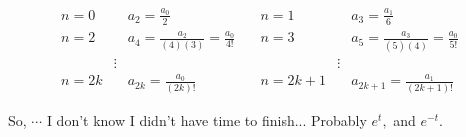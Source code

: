 \documentclass{article}
\begin{document}
\begin{align*}
  n=0 &\quad a_2 =\frac{a_0}{2} &\quad n=1 &\quad a_{3} = \frac{a_1}{6} \\
  n=2 &\quad a_{4} = \frac{a_2}{(4)(3)} = \frac{a_0}{4!}  &\quad n=3
                                           &\quad a_{5} =
                                             \frac{a_3}{(5)(4)} =
                                             \frac{a_0}{5!}\\
      &\vdots &\quad &\vdots\\
n=2k &\quad a_{2k} = \frac{a_0}{(2k)!}  &\quad n=2k+1   &\quad a_{2k+1} = \frac{a_1}{(2k+1)!}
\end{align*}

So, $\cdots$ I don't know I didn't have time to finish... Probably $
e^{t},$ and $e^{-t}.$








\end{document}
